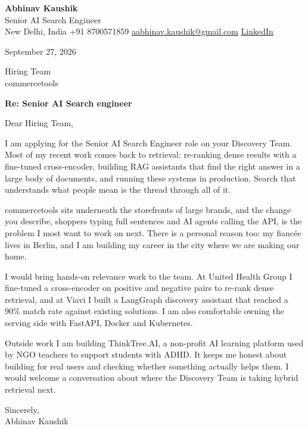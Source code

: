 \documentclass[11pt,a4paper]{article}
\begin{document}
{\Large\bfseries Abhinav Kaushik}\\
Senior AI Search Engineer\\
New Delhi, India \textbar{} +91 8700571859 \textbar{} \href{mailto:aabhinav.kaushik@gmail.com}{aabhinav.kaushik@gmail.com} \textbar{} \href{https://www.linkedin.com/in/abhinav-kaushik10/}{LinkedIn}  

September 27, 2026

Hiring Team\\
commercetools

\textbf{Re: Senior AI Search engineer}

Dear Hiring Team,

I am applying for the Senior AI Search Engineer role on your Discovery Team. Most of my recent work comes back to retrieval: re-ranking dense results with a fine-tuned cross-encoder, building RAG assistants that find the right answer in a large body of documents, and running these systems in production. Search that understands what people mean is the thread through all of it.

commercetools sits underneath the storefronts of large brands, and the change you describe, shoppers typing full sentences and AI agents calling the API, is the problem I most want to work on next. There is a personal reason too: my fiancée lives in Berlin, and I am building my career in the city where we are making our home.

I would bring hands-on relevance work to the team. At United Health Group I fine-tuned a cross-encoder on positive and negative pairs to re-rank dense retrieval, and at Viavi I built a LangGraph discovery assistant that reached a 90\% match rate against existing solutions. I am also comfortable owning the serving side with FastAPI, Docker and Kubernetes.

Outside work I am building ThinkTree.AI, a non-profit AI learning platform used by NGO teachers to support students with ADHD. It keeps me honest about building for real users and checking whether something actually helps them. I would welcome a conversation about where the Discovery Team is taking hybrid retrieval next.

Sincerely,\\[4pt]
Abhinav Kaushik
\end{document}

